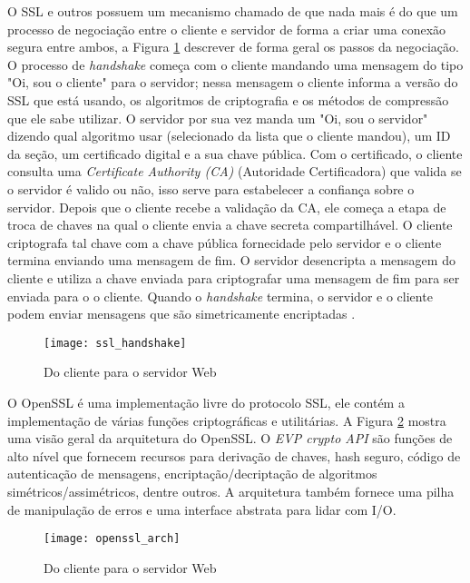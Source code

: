 O SSL e outros possuem um mecanismo chamado de  que
nada mais é do que um processo de negociação entre o cliente e servidor de
forma a criar uma conexão segura entre ambos, a Figura
\ref{fig:openssl_handshake} descrever de forma geral os passos da negociação. O
processo de \textit{handshake} começa com o cliente mandando uma mensagem do
tipo "Oi, sou o cliente" para o servidor; nessa mensagem o cliente informa a
versão do SSL que está usando, os algoritmos de criptografia e os métodos de
compressão que ele sabe utilizar. O servidor por sua vez manda um "Oi, sou o
servidor" dizendo qual algoritmo usar (selecionado da lista que o cliente
mandou), um ID da seção, um certificado digital e a sua chave pública. Com o
certificado, o cliente consulta uma \textit{Certificate Authority (CA)}
(Autoridade Certificadora) que valida se o servidor é valido ou não, isso serve
para estabelecer a confiança sobre o servidor. Depois que o cliente recebe a
validação da CA, ele começa a etapa de troca de chaves na qual o cliente envia
a chave secreta compartilhável. O cliente criptografa tal chave com a chave
pública fornecidade pelo servidor e o cliente termina enviando uma mensagem de
fim. O servidor desencripta a mensagem do cliente e utiliza a chave enviada
para criptografar uma mensagem de fim para ser enviada para o o cliente. Quando
o \textit{handshake} termina, o servidor e o cliente podem enviar mensagens que
são simetricamente encriptadas \citep{openssl}.

\begin{figure}[!h]
  \centering
  \texttt{[image: ssl\_handshake]}
  \caption{Do cliente para o servidor Web}
  \label{fig:openssl_handshake}
\end{figure}

O OpenSSL é uma implementação livre do protocolo SSL, ele contém a
implementação de várias funções criptográficas e utilitárias. A Figura
\ref{fig:openssl_arch} mostra uma visão geral da arquitetura do OpenSSL. O
\textit{EVP crypto API} são funções de alto nível que fornecem recursos para
derivação de chaves, hash seguro, código de autenticação de mensagens,
encriptação/decriptação de algoritmos simétricos/assimétricos, dentre outros. A
arquitetura também fornece uma pilha de manipulação de erros e uma interface
abstrata para lidar com I/O.

\begin{figure}[!h]
  \centering
  \texttt{[image: openssl\_arch]}
  \caption{Do cliente para o servidor Web \citep{crypto_openssl}}
  \label{fig:openssl_arch}
\end{figure}


